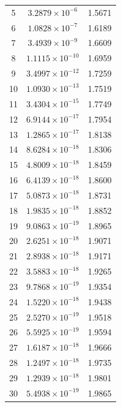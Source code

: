 \documentclass[11pt,a4paper]{article}
\begin{document}
\begin{enumerate}
\begin{center}
\begin{tabular}{|c|c|c|}
			5 &$3.2879 \times 10^{-6}$ &1.5671 \\
			6 &$1.0828 \times 10^{-7}$ &1.6189 \\
			7 &$3.4939 \times 10^{-9}$ &1.6609 \\
			8 &$1.1115 \times 10^{-10}$ &1.6959 \\
			9 &$3.4997 \times 10^{-12}$ &1.7259 \\
			10 &$1.0930 \times 10^{-13}$ &1.7519 \\
			11 &$3.4304 \times 10^{-15}$ &1.7749 \\
			12 &$6.9144 \times 10^{-17}$ &1.7954 \\
			13 &$1.2865 \times 10^{-17}$ &1.8138 \\
			14 &$8.6284 \times 10^{-18}$ &1.8306 \\
			15 &$4.8009 \times 10^{-18}$ &1.8459 \\
			16 &$6.4139 \times 10^{-18}$ &1.8600 \\
			17 &$5.0873 \times 10^{-18}$ &1.8731 \\
			18 &$1.9835 \times 10^{-18}$ &1.8852  \\
			19 &$9.0863 \times 10^{-19}$ &1.8965 \\
			20 &$2.6251 \times 10^{-18}$ &1.9071 \\
			21 &$2.8938 \times 10^{-18}$ &1.9171 \\
			22 &$3.5883 \times 10^{-18}$ &1.9265 \\
			23 &$9.7868 \times 10^{-19}$ &1.9354 \\
			24 &$1.5220 \times 10^{-18}$ &1.9438 \\
			25 &$2.5270 \times 10^{-19}$ &1.9518 \\
			26 &$5.5925 \times 10^{-19}$ &1.9594 \\
			27 &$1.6187 \times 10^{-18}$ &1.9666 \\
			28 &$1.2497 \times 10^{-18}$ &1.9735  \\
			29 &$1.2939 \times 10^{-18}$ &1.9801 \\
			30 &$5.4938 \times 10^{-19}$ &1.9865 \\
			\hline
		\end{tabular}
	\end{center}
	

\end{enumerate}
\end{document}
